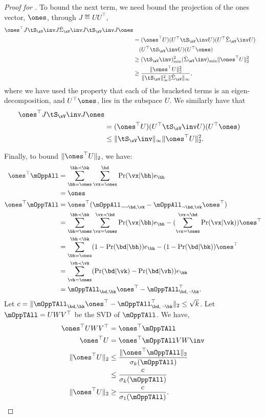 \begin{proof}[Proof for ]
  To bound the next term, we need bound the projection of the ones
  vector, $\ones$, through $J \eqdef U U^\top$,
  \begin{align*}
      \ones^\top J \tS_\sV\inv J \tilde\Sigma_\sV\inv J \tS_\sV\inv J \ones \\
      &=
      (\ones^\top U) (U^\top \tS_\sV\inv U) (U^\top \tilde\Sigma_\sV\inv U) \\
      &\quad (U^\top \tS_\sV\inv U) (U^\top \ones)  \\
      &\ge 
      (\tS_\sV\inv)^2_{\min}
      (\tilde\Sigma_\sV\inv)_{\min}
      \|\ones^\top U\|^2_2 \\
      &\ge 
      \frac{\|\ones^\top U\|^2_2}{\|\tS_\sV\|^2_\infty \|\tilde\Sigma_\sV\|_\infty},
  \end{align*}
  where we have used the property that each of the bracketed terms is an
  eigen-decomposition, and $U^\top \ones$, lies in the subspace $U$.
  We similarly have that
  \begin{align*}
      \ones^\top J \tS_\sV\inv J \ones \\
      &=
      (\ones^\top U) (U^\top \tS_\sV\inv U) (U^\top \ones) \\
      &\le 
      \|\tS_\sV\inv\|_{\infty}
      \|\ones^\top U\|^2_2.
  \end{align*}

  Finally, to bound $\|\ones^\top U\|_2$, we have:
  \begin{align*}
    \ones^\top \mOppAll 
      &= \sum_{\bh = \ones}^{\bh \prec \bk} \sum_{\vx = \ones}^{\bd} \Pr(\vx | \bh) e_\bh  \\
      &= \ones \\
    \ones^\top \mOppTAll 
        &= \ones^\top (\mOppAll_{\neg \neg \bd, \vk} - \mOppAll_{\neg \bd, \vk}\ones^\top) \\
        &= \sum_{\bh = \ones}^{\bh \prec \bk} \sum_{\vx = \ones}^{\vx \prec \bd} \Pr(\vx | \bh) e_\bh - (\sum_{\vx = \ones}^{\vx \prec \bd} \Pr(\vx | \vk)) \ones^\top  \\
        &= \sum_{\bh = \ones}^{\bh \prec \bk} (1 - \Pr(\bd | \bh)) e_\bh - (1 - \Pr(\bd | \bk)) \ones^\top  \\
        &= \sum_{\vh = \ones}^{\vh \prec \vk} (\Pr(\bd | \vk) - \Pr(\bd | \vh))e_\bh \\
        &= \mOppTAll_{\bd,\bk} \ones^\top - \mOppTAll_{\bd,\neg \bk}^\top.
  \end{align*}
  Let $c = \|\mOppTAll_{\bd,\bk} \ones^\top - \mOppTAll_{\bd,\neg
  \bk}^\top\|_2 \le \sqrt{k}$.
  Let $\mOppTAll = U W V^\top$ be the SVD of $\mOppTAll$. We have,
  \begin{align*}
    \ones^\top U W V^\top 
        &= \ones^\top \mOppTAll \\
    \ones^\top U 
      &= \ones^\top \mOppTAll V W\inv \\
    \|\ones^\top U\|_2 
        &\le \frac{\|\ones^\top \mOppTAll\|_2}{\sigma_{k}(\mOppTAll)} \\
        &\le \frac{c}{\sigma_{k}(\mOppTAll)} \\
    \|\ones^\top U\|_2 
        &\ge \frac{c}{\sigma_{1}(\mOppTAll)}.
  \end{align*}


\end{proof}

